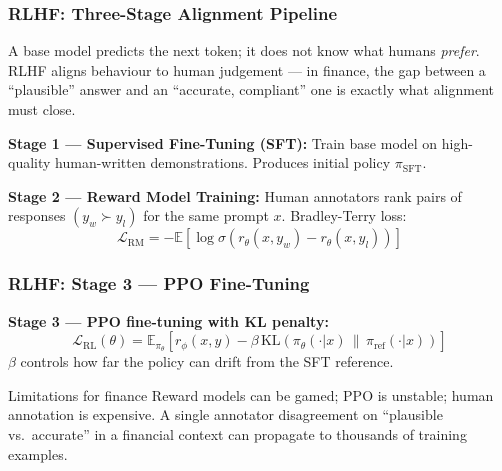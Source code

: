 \documentclass[9pt,t]{beamer}
\begin{document}
\begin{frame}
\frametitle{RLHF: Three-Stage Alignment Pipeline}

\begin{bigpicture}
  A base model predicts the next token; it does not know what humans \emph{prefer}.
  RLHF aligns behaviour to human judgement --- in finance, the gap between a
  ``plausible'' answer and an ``accurate, compliant'' one is exactly what alignment
  must close.
\end{bigpicture}

\medskip
\textbf{Stage 1 --- Supervised Fine-Tuning (SFT):}
Train base model on high-quality human-written demonstrations.
Produces initial policy $\pi_{\text{SFT}}$.

\medskip
\textbf{Stage 2 --- Reward Model Training:}
Human annotators rank pairs of responses $(y_w \succ y_l)$ for the same prompt $x$.
Bradley-Terry loss:
\[
  \mathcal{L}_{\text{RM}} = -\mathbb{E}\!\left[\log \sigma\!\left(r_\theta(x,y_w) - r_\theta(x,y_l)\right)\right]
\]
\end{frame}

\begin{frame}
\frametitle{RLHF: Stage 3 --- PPO Fine-Tuning}

\begin{underhood}
\textbf{Stage 3 --- PPO fine-tuning with KL penalty:}
\[
  \mathcal{L}_{\text{RL}}(\theta) = \mathbb{E}_{\pi_\theta}\!\left[r_\phi(x,y)
  - \beta\,\mathrm{KL}\!\left(\pi_\theta(\cdot|x) \,\|\, \pi_{\text{ref}}(\cdot|x)\right)\right]
\]
$\beta$ controls how far the policy can drift from the SFT reference.
\end{underhood}

\medskip
\begin{alertblock}{Limitations for finance}
  Reward models can be gamed; PPO is unstable; human annotation is expensive.
  A single annotator disagreement on ``plausible vs.\ accurate'' in a financial
  context can propagate to thousands of training examples.
\end{alertblock}
\end{frame}
\end{document}
